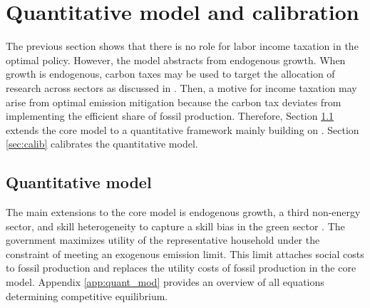 \section{Quantitative model and calibration}\label{sec:model}

The previous section shows that there is no role for labor income taxation in the optimal policy. However, the model abstracts from endogenous growth. When growth is endogenous, carbon taxes may be used to target the allocation of research across sectors as discussed in \cite{Acemoglu2012TheChange}. Then, a motive for income taxation may arise from optimal emission mitigation because the carbon tax deviates from implementing the efficient share of fossil production. 
Therefore, Section \ref{sec_quantmod} extends the core model to a quantitative framework mainly building on \cite{Fried2018ClimateAnalysis}. Section \ref{sec:calib} calibrates the quantitative model. 

\subsection{Quantitative model}\label{sec_quantmod}


The main extensions to the core model is endogenous growth, a third non-energy sector, and skill heterogeneity to capture a skill bias in the green sector \citep{Consoli2016DoCapital}. 
The government maximizes utility of the representative household under the constraint of meeting an exogenous emission limit. This limit attaches social costs to fossil production and replaces the utility costs of fossil production in the core model. 
Appendix \ref{app:quant_mod} provides an overview of all equations determining competitive equilibrium.

